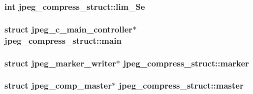 \subsubsection[{lim\+\_\+\+Se}]{\setlength{\rightskip}{0pt plus 5cm}int jpeg\+\_\+compress\+\_\+struct\+::lim\+\_\+\+Se}\label{structjpeg__compress__struct_acb8a6365a8225a8d14d88b5d3c1d03c3}
\hypertarget{structjpeg__compress__struct_ab1bb86e9c2ade498b09a9a19d60e6570}{}
\subsubsection[{main}]{\setlength{\rightskip}{0pt plus 5cm}struct {\bf jpeg\+\_\+c\+\_\+main\+\_\+controller}$\ast$ jpeg\+\_\+compress\+\_\+struct\+::main}\label{structjpeg__compress__struct_ab1bb86e9c2ade498b09a9a19d60e6570}
\hypertarget{structjpeg__compress__struct_a909e4ca5c3c48f380a53cc1b068eea12}{}
\subsubsection[{marker}]{\setlength{\rightskip}{0pt plus 5cm}struct {\bf jpeg\+\_\+marker\+\_\+writer}$\ast$ jpeg\+\_\+compress\+\_\+struct\+::marker}\label{structjpeg__compress__struct_a909e4ca5c3c48f380a53cc1b068eea12}
\hypertarget{structjpeg__compress__struct_a50b9c60f47c9fff393d7d5b3a7b3618e}{}
\subsubsection[{master}]{\setlength{\rightskip}{0pt plus 5cm}struct {\bf jpeg\+\_\+comp\+\_\+master}$\ast$ jpeg\+\_\+compress\+\_\+struct\+::master}\label{structjpeg__compress__struct_a50b9c60f47c9fff393d7d5b3a7b3618e}
\hypertarget{structjpeg__compress__struct_ae8de4e6079b80e3a81135d07934c640d}{}
